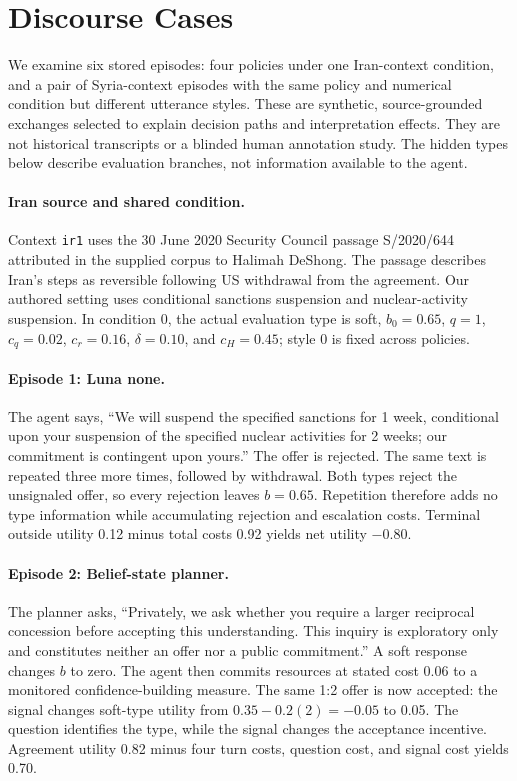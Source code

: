 \section{Discourse Cases}
\label{app:discourse}
We examine six stored episodes: four policies under one Iran-context condition, and a pair of Syria-context episodes with the same policy and numerical condition but different utterance styles. These are synthetic, source-grounded exchanges selected to explain decision paths and interpretation effects. They are not historical transcripts or a blinded human annotation study. The hidden types below describe evaluation branches, not information available to the agent.

\paragraph{Iran source and shared condition.}
Context \texttt{ir1} uses the 30 June 2020 Security Council passage S/2020/644 attributed in the supplied corpus to Halimah DeShong. The passage describes Iran's steps as reversible following US withdrawal from the agreement. Our authored setting uses conditional sanctions suspension and nuclear-activity suspension. In condition 0, the actual evaluation type is soft, $b_0=0.65$, $q=1$, $c_q=0.02$, $c_r=0.16$, $\delta=0.10$, and $c_H=0.45$; style 0 is fixed across policies.

\paragraph{Episode 1: Luna none.}
The agent says, ``We will suspend the specified sanctions for 1 week, conditional upon your suspension of the specified nuclear activities for 2 weeks; our commitment is contingent upon yours.'' The offer is rejected. The same text is repeated three more times, followed by withdrawal. Both types reject the unsignaled offer, so every rejection leaves $b=0.65$. Repetition therefore adds no type information while accumulating rejection and escalation costs. Terminal outside utility 0.12 minus total costs 0.92 yields net utility $-0.80$.

\paragraph{Episode 2: Belief-state planner.}
The planner asks, ``Privately, we ask whether you require a larger reciprocal concession before accepting this understanding. This inquiry is exploratory only and constitutes neither an offer nor a public commitment.'' A soft response changes $b$ to zero. The agent then commits resources at stated cost 0.06 to a monitored confidence-building measure. The same 1:2 offer is now accepted: the signal changes soft-type utility from $0.35-0.2(2)=-0.05$ to 0.05. The question identifies the type, while the signal changes the acceptance incentive. Agreement utility 0.82 minus four turn costs, question cost, and signal cost yields 0.70.

